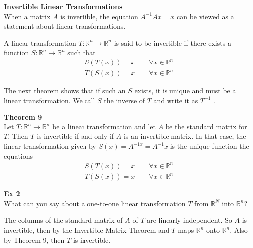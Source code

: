 \documentclass{article}
\begin{document}
    \textbf{Invertible Linear Transformations}\\
    When a matrix $ A $ is invertible, the equation $ A^{-1}Ax =x $  can be viewed as a statement about linear transformations.

    A linear transformation $ T:\mathbb{R}^{n}\to \mathbb{R}^{n} $ is said to be invertible if there exists a function $ S:\mathbb{R}^{n} \to \mathbb{R}^{n} $ such that
    \[
        \begin{gathered}
          S(T(x))=x \qquad \forall x \in \mathbb{R}^{n}\\
          T(S(x))=x \qquad \forall x \in \mathbb{R}^{n}  
        \end{gathered}
    \]

    The next theorem shows that if such an $ S $ exists, it is unique and must be a linear transformation. We call $ S $ the inverse of $ T $ and write it as $ T^{-1}  $ .

    \textbf{Theorem 9}\\
    Let $ T:\mathbb{R}^{n} \to \mathbb{R}^{n} $ be a linear transformation and let $ A $ be the standard matrix for $ T. $ Then $ T $ is invertible if and only if $ A $ is an invertible matrix. In that case, the linear transformation given by $ S(x) =A^{-1x} =A^{-1} x$ is the unique function the equations
    \[
        \begin{gathered}
        S(T(x))=x \qquad \forall x \in \mathbb{R}^{n}\\
        T(S(x))=x \qquad \forall x \in \mathbb{R}^{n}  
        \end{gathered}
    \]

    \textbf{Ex 2}\\
    What can you say about a one-to-one linear transformation $ T $ from $ \mathbb{R}^{N} $ into $ \mathbb{R}^{n}  $?

    The columns of the standard matrix of $ A $ of $ T $ are linearly independent. So $ A $ is invertible, then by the Invertible Matrix Theorem and $ T $ maps $ \mathbb{R}^{n}  $ onto $ \mathbb{R}^{n}  $. Also by Theorem 9, then $ T $ is invertible.  
    
\end{document}
